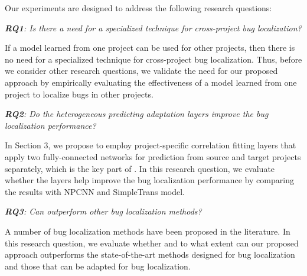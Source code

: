 
Our experiments are designed to address the following research questions:

\vspace{0.2cm}\noindent\textit{\textbf{RQ1}: Is there a need for a specialized technique for cross-project bug localization?}

If a model learned from one project can be used for other projects, then there is no need for a specialized technique for cross-project bug localization. Thus, before we consider other research questions, we validate the need for our proposed approach by empirically evaluating the effectiveness of a model learned from one project to localize bugs in other projects.

\vspace{0.2cm}\noindent\textit{\textbf{RQ2}: Do the heterogeneous predicting adaptation layers improve the bug localization performance?}


In Section 3, we propose to employ project-specific correlation fitting layers that apply two fully-connected networks for prediction from source and target projects separately, which is the key part of \TRANPCNN. In this research question, we evaluate whether the layers help improve the bug localization performance by comparing the results with NPCNN and SimpleTrans model.  

\vspace{0.2cm}\noindent\textit{\textbf{RQ3}: Can \TRANPCNN outperform other bug localization methods?}

A number of bug localization methods have been proposed in the literature. In this research question, we evaluate whether and to what extent can our proposed approach \TRANPCNN outperforms the state-of-the-art methods designed for bug localization and those that can be adapted for bug localization. 
